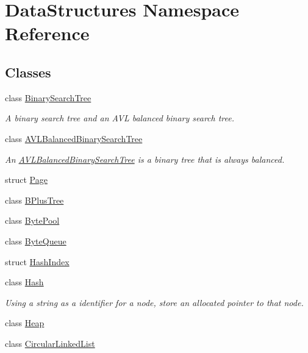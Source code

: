 \hypertarget{namespace_data_structures}{\section{Data\-Structures Namespace Reference}
\label{namespace_data_structures}
}
\subsection*{Classes}
\begin{DoxyCompactItemize}
\item 
class \hyperlink{class_data_structures_1_1_binary_search_tree}{Binary\-Search\-Tree}
\begin{DoxyCompactList}\small\item\em A binary search tree and an A\-V\-L balanced binary search tree. \end{DoxyCompactList}\item 
class \hyperlink{class_data_structures_1_1_a_v_l_balanced_binary_search_tree}{A\-V\-L\-Balanced\-Binary\-Search\-Tree}
\begin{DoxyCompactList}\small\item\em An \hyperlink{class_data_structures_1_1_a_v_l_balanced_binary_search_tree}{A\-V\-L\-Balanced\-Binary\-Search\-Tree} is a binary tree that is always balanced. \end{DoxyCompactList}\item 
struct \hyperlink{struct_data_structures_1_1_page}{Page}
\item 
class \hyperlink{class_data_structures_1_1_b_plus_tree}{B\-Plus\-Tree}
\item 
class \hyperlink{class_data_structures_1_1_byte_pool}{Byte\-Pool}
\item 
class \hyperlink{class_data_structures_1_1_byte_queue}{Byte\-Queue}
\item 
struct \hyperlink{struct_data_structures_1_1_hash_index}{Hash\-Index}
\item 
class \hyperlink{class_data_structures_1_1_hash}{Hash}
\begin{DoxyCompactList}\small\item\em Using a string as a identifier for a node, store an allocated pointer to that node. \end{DoxyCompactList}\item 
class \hyperlink{class_data_structures_1_1_heap}{Heap}
\item 
class \hyperlink{class_data_structures_1_1_circular_linked_list}{Circular\-Linked\-List}

\end{DoxyCompactItemize}
